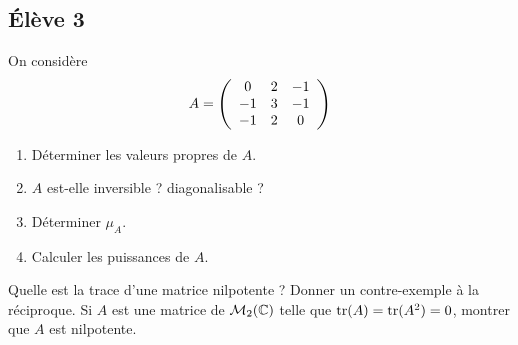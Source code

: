 \documentclass[10pt]{scrartcl}
\begin{document}
    \subsection*{Élève 3}
    \begin{ccp}
        On considère 
        \[
            A=\left(\begin{array}{c c c}
                0 & 2 & -1\\
                -1 & 3 & -1\\
                -1 & 2 & 0
            \end{array}\right)
        \]
        \begin{enumerate}
            \item Déterminer les valeurs propres de $A$. 
            \item $A$ est-elle inversible ? diagonalisable ?
            \item Déterminer $\mu_A$.
            \item Calculer les puissances de $A$.
        \end{enumerate}
    \end{ccp}

    \begin{exo}
        Quelle est la trace d'une matrice nilpotente ? 
        Donner un contre-exemple à la réciproque. 
        Si $A$ est une matrice de $\mathcal M_2(\operatorname{\mathbb C})$ 
        telle que $\operatorname{tr}(A)=\operatorname{tr}(A^2)=0$, montrer que $A$ 
        est nilpotente.
    \end{exo}
\end{document}
